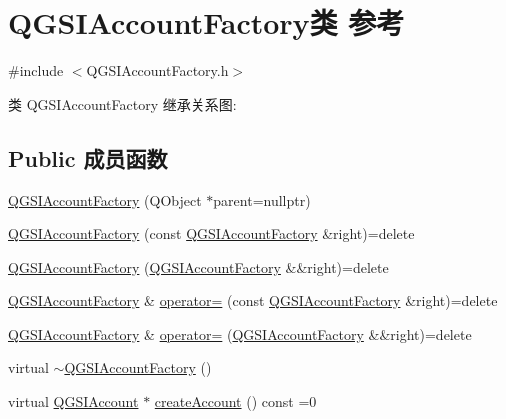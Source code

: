 \hypertarget{class_q_g_s_i_account_factory}{}\section{Q\+G\+S\+I\+Account\+Factory类 参考}
\label{class_q_g_s_i_account_factory}


{\ttfamily \#include $<$Q\+G\+S\+I\+Account\+Factory.\+h$>$}



类 Q\+G\+S\+I\+Account\+Factory 继承关系图\+:
\subsection*{Public 成员函数}
\begin{DoxyCompactItemize}
\item 
\mbox{\hyperlink{class_q_g_s_i_account_factory_a9d7d61d50b0ea31b0c0eabf9ea73aa05}{Q\+G\+S\+I\+Account\+Factory}} (Q\+Object $\ast$parent=nullptr)
\item 
\mbox{\hyperlink{class_q_g_s_i_account_factory_a11b1beda5f0422f6a2f8a3041862714c}{Q\+G\+S\+I\+Account\+Factory}} (const \mbox{\hyperlink{class_q_g_s_i_account_factory}{Q\+G\+S\+I\+Account\+Factory}} \&right)=delete
\item 
\mbox{\hyperlink{class_q_g_s_i_account_factory_ad5e1c104c6df15af55a9c0eb83d174a2}{Q\+G\+S\+I\+Account\+Factory}} (\mbox{\hyperlink{class_q_g_s_i_account_factory}{Q\+G\+S\+I\+Account\+Factory}} \&\&right)=delete
\item 
\mbox{\hyperlink{class_q_g_s_i_account_factory}{Q\+G\+S\+I\+Account\+Factory}} \& \mbox{\hyperlink{class_q_g_s_i_account_factory_a30f939b03d578e8d364a6db6125f5203}{operator=}} (const \mbox{\hyperlink{class_q_g_s_i_account_factory}{Q\+G\+S\+I\+Account\+Factory}} \&right)=delete
\item 
\mbox{\hyperlink{class_q_g_s_i_account_factory}{Q\+G\+S\+I\+Account\+Factory}} \& \mbox{\hyperlink{class_q_g_s_i_account_factory_a800ea32fa3c61d24004b22f0db23acc4}{operator=}} (\mbox{\hyperlink{class_q_g_s_i_account_factory}{Q\+G\+S\+I\+Account\+Factory}} \&\&right)=delete
\item 
virtual \mbox{\hyperlink{class_q_g_s_i_account_factory_a74c0fa207f6d0a42b0cc0efec627f7ff}{$\sim$\+Q\+G\+S\+I\+Account\+Factory}} ()
\item 
virtual \mbox{\hyperlink{class_q_g_s_i_account}{Q\+G\+S\+I\+Account}} $\ast$ \mbox{\hyperlink{class_q_g_s_i_account_factory_adf21a37bf465543c022b2bee9e61c3fd}{create\+Account}} () const =0
\end{DoxyCompactItemize}


